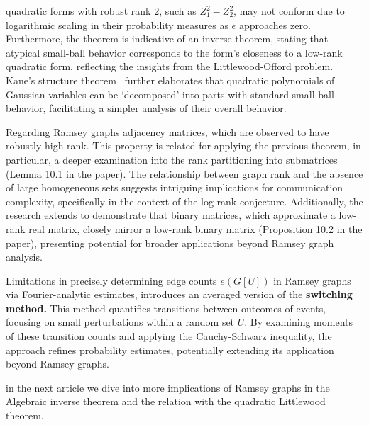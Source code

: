 quadratic forms with robust rank 2, such as \( Z_1^2 - Z_2^2 \),
may not conform due to logarithmic scaling in their probability measures as \( \epsilon \)
approaches zero. 
Furthermore, the theorem is indicative of an inverse theorem,
stating that atypical small-ball behavior corresponds to the form's
closeness to a low-rank quadratic form, 
reflecting the insights from the Littlewood-Offord problem.
Kane's structure theorem~\cite{kane2017structure} further elaborates that quadratic polynomials
of Gaussian variables can be `decomposed' into parts with standard small-ball behavior,
facilitating a simpler analysis of their overall behavior.

Regarding Ramsey graphs adjacency matrices,
which are observed to have robustly high rank.
This property is related for applying the previous theorem,
in particular, a deeper examination into the rank
partitioning into submatrices (Lemma 10.1 in the paper).
The relationship between graph rank and the absence of large homogeneous sets suggests
intriguing implications for communication complexity,
specifically in the context of the log-rank conjecture.
Additionally, the research extends to demonstrate that binary matrices,
which approximate a low-rank real matrix,
closely mirror a low-rank binary matrix (Proposition 10.2 in the paper),
presenting potential for broader applications beyond Ramsey graph analysis.

Limitations in precisely determining edge counts \(e(G[U])\)
in Ramsey graphs via Fourier-analytic estimates,
introduces an averaged version of the \textbf{switching method.}
This method quantifies transitions between outcomes of events, focusing on small
perturbations within a random set \(U\). By examining moments of these transition
counts and applying the Cauchy-Schwarz inequality, the approach refines probability
estimates, potentially extending its 
application beyond Ramsey graphs.

in the next article we dive into more implications of Ramsey graphs in the 
Algebraic inverse theorem and the relation with the quadratic Littlewood theorem.


